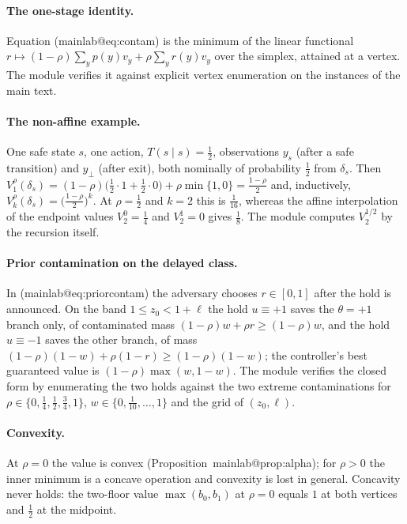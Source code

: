 \documentclass[11pt,a4paper]{article}
\makeatletter
\theoremstyle{plain}
\theoremstyle{definition}
\theoremstyle{remark}
\newcommand{\tfr}[2]{\tfrac{#1}{#2}}
\newcommand{\mref}[1]{\csname mainlab@#1\endcsname}
\newcommand{\meqref}[1]{(\mref{#1})}
\makeatother
\begin{document}
\paragraph{The one-stage identity.} Equation \meqref{eq:contam} is the minimum of the linear functional $r\mapsto(1-\rho)\sum_yp(y)v_y+\rho\sum_yr(y)v_y$ over the simplex, attained at a vertex. The module verifies it against explicit vertex enumeration on the instances of the main text.

\paragraph{The non-affine example.} One safe state $s$, one action, $T(s\mid s)=\tfr12$, observations $y_s$ (after a safe transition) and $y_\bot$ (after exit), both nominally of probability $\tfr12$ from $\delta_s$. Then $V^\rho_1(\delta_s)=(1-\rho)\bigl(\tfr12\cdot1+\tfr12\cdot0\bigr)+\rho\min\{1,0\}=\tfr{1-\rho}2$ and, inductively, $V^\rho_{k}(\delta_s)=\bigl(\tfr{1-\rho}2\bigr)^{k}$. At $\rho=\tfr12$ and $k=2$ this is $\tfr1{16}$, whereas the affine interpolation of the endpoint values $V^0_2=\tfr14$ and $V^1_2=0$ gives $\tfr18$. The module computes $V^{1/2}_2$ by the recursion itself.

\paragraph{Prior contamination on the delayed class.} In \meqref{eq:priorcontam} the adversary chooses $r\in[0,1]$ after the hold is announced. On the band $1\le z_0<1+\ell$ the hold $u\equiv+1$ saves the $\theta=+1$ branch only, of contaminated mass $(1-\rho)w+\rho r\ge(1-\rho)w$, and the hold $u\equiv-1$ saves the other branch, of mass $(1-\rho)(1-w)+\rho(1-r)\ge(1-\rho)(1-w)$; the controller's best guaranteed value is $(1-\rho)\max(w,1-w)$. The module verifies the closed form by enumerating the two holds against the two extreme contaminations for $\rho\in\{0,\tfr14,\tfr12,\tfr34,1\}$, $w\in\{0,\tfr1{10},\dots,1\}$ and the grid of $(z_0,\ell)$.

\paragraph{Convexity.} At $\rho=0$ the value is convex (Proposition~\mref{prop:alpha}); for $\rho>0$ the inner minimum is a concave operation and convexity is lost in general. Concavity never holds: the two-floor value $\max(b_0,b_1)$ at $\rho=0$ equals $1$ at both vertices and $\tfr12$ at the midpoint.
\end{document}
